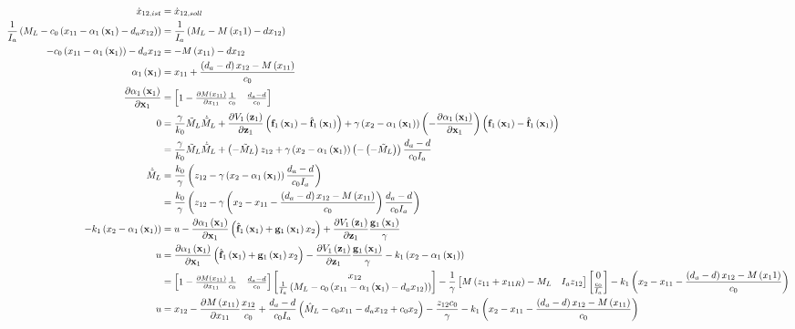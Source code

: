 \documentclass[10pt,a3paper,landscape]{article}
\begin{document}
\begin{align}
	\dot{x}_{12,ist}&=\dot{x}_{12,soll}\\
	\frac{1}{I_a}\mybr{M_L-c_0\mybr{x_{11}-\alphae-d_a x_{12}}}&=\frac{1}{I_a}\mybr{M_L-M\mybr{x_11}-d x_{12}}\\
	-c_0\mybr{x_{11}-\alphae}-d_a x_{12}&=-M\mybr{x_{11}}-d x_{12}\\
	\alphae&=x_{11}+\frac{\mybr{d_a-d}x_{12}-M\mybr{x_{11}}}{c_0}\\
	\dadxe&=\begin{bmatrix}1-\frac{\partial M\mybr{x_{11}}}{\partial x_{11}} \frac{1}{c_0} & \frac{d_a-d}{c_0}\end{bmatrix}\\
	0&=\frac{\gamma}{k_0}\mls\mlsp+\dVedze\mybr{\fe-\fed}+\gamma\mybr{x_2-\alphae}\mybr{-\dadxe}\mybr{\fe-\fed}\\
	&=\frac{\gamma}{k_0}\mls\mlsp+\mybr{-\mls}z_{12}+\gamma\mybr{x_2-\alphae}\mybr{-\mybr{-\mls}}\frac{d_a-d}{c_0I_a}\\
	\mlsp&=\frac{k_0}{\gamma}\mybr{z_{12}-\gamma\mybr{x_2-\alphae}\frac{d_a-d}{c_0 I_a}}\\
	&=\frac{k_0}{\gamma}\mybr{z_{12}-\gamma\mybr{x_2-x_{11}-\frac{\mybr{d_a-d}x_{12}-M\mybr{x_{11}}}{c_0}}\frac{d_a-d}{c_0 I_a}}\\
	-k_1\mybr{x_2-\alphae}&=u-\dadxe\mybr{\fed+\ge x_2}+\dVedze \frac{\ge}{\gamma}\\
	u&=\dadxe\mybr{\fed+\ge x_2}-\dVedze \frac{\ge}{\gamma}-k_1\mybr{x_2-\alphae}\\
	&=\begin{bmatrix}1-\frac{\partial M\mybr{x_{11}}}{\partial x_{11}} \frac{1}{c_0} & \frac{d_a-d}{c_0}\end{bmatrix}\begin{bmatrix}x_{12}\\
	\frac{1}{I_a}\mybr{M_L-c_0\mybr{x_{11}-\alphae-d_a x_{12}}}
	\end{bmatrix}-\frac{1}{\gamma}\begin{bmatrix}M\mybr{z_{11}+x_{11R}}-M_L & I_a z_{12}\end{bmatrix}\begin{bmatrix}
	0\\\frac{c_0}{I_a}
	\end{bmatrix}-k_1\mybr{x_2-x_{11}-\frac{\mybr{d_a-d}x_{12}-M\mybr{x_11}}{c_0}}\\
	u&=x_{12}-\frac{\partial M\mybr{x_{11}}}{\partial x_{11}}\frac{x_{12}}{c_0}+\frac{d_a-d}{c_0 I_a}\mybr{\mld-c_0 x_{11}-d_a x_{12}+c_0 x_2}-\frac{z_{12} c_0}{\gamma}-k_1\mybr{x_2-x_{11}-\frac{\mybr{d_a-d}x_{12}-M\mybr{x_{11}}}{c_0}}
\end{align}
\end{document}
